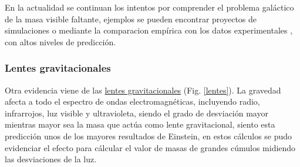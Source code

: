 
En la actualidad se continuan los intentos por comprender el problema galáctico de la masa visible faltante, ejemplos se pueden encontrar proyectos de simulaciones \citep{deur_relativistic_2020, wu_galactic_2015} o mediante la comparacion empírica con los datos experimentales \cite{mielke_dark_2006}, con altos niveles de predicción.


\subsubsection{Lentes gravitacionales}
Otra evidencia viene de las \href{https://en.wikipedia.org/wiki/Gravitational_lens}{lentes gravitacionales} (Fig. \ref{lentes}). La gravedad afecta a todo el espectro de ondas electromagnéticas, incluyendo radio, infrarrojos, luz visible y ultravioleta, siendo el grado de desviación mayor mientras mayor sea la masa que actúa como lente gravitacional, siento esta predicción unos de los mayores resultados de Einstein, en estos cálculos se pudo evidenciar el efecto para cálcular el valor de masas de grandes cúmulos midiendo las desviaciones de la luz.

